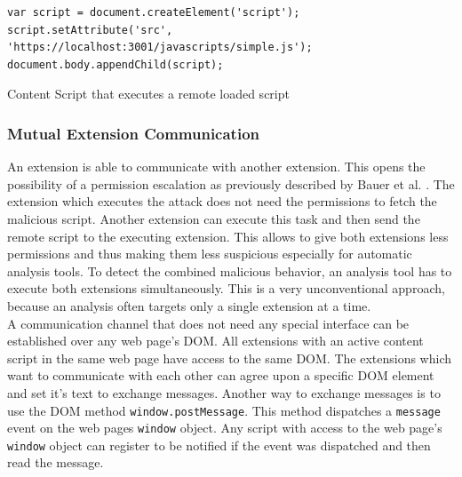 			\begin{code}
				\begin{lstlisting}	
var script = document.createElement('script');
script.setAttribute('src', 'https://localhost:3001/javascripts/simple.js');
document.body.appendChild(script);
				\end{lstlisting}
				\caption{Content Script that executes a remote loaded script}
				\label{contentScriptRemotLoad}
			\end{code}
		
	
		\subsubsection{Mutual Extension Communication}
				
			An extension is able to communicate with another extension. This opens the possibility of a permission escalation as previously described by Bauer et al. \cite{extensions:cns14}. The extension which executes the attack does not need the permissions to fetch the malicious script. Another extension can execute this task and then send the remote script to the executing extension. This allows to give both extensions less permissions and thus making them less suspicious especially for automatic analysis tools. To detect the combined malicious behavior, an analysis tool has to execute both extensions simultaneously. This is a very unconventional approach, because an analysis often targets only a single extension at a time. \\
			
			A communication channel that does not need any special interface can be established over any web page's DOM. All extensions with an active content script in the same web page have access to the same DOM. The extensions which want to communicate with each other can agree upon a specific DOM element and set it's text to exchange messages. Another way to exchange messages is to use the DOM method \texttt{window.postMessage}. This method dispatches a \texttt{message} event on the web pages \texttt{window} object. Any script with access to the web page's \texttt{window} object can register to be notified if the event was dispatched and then read the message. \\
			
